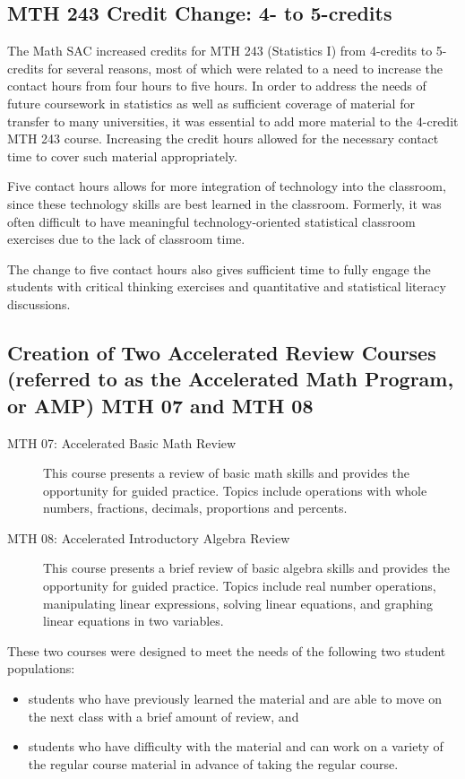 \subsection{MTH 243 Credit Change: 4- to 5-credits}
The Math SAC increased credits for MTH 243 (Statistics I) from 4-credits to 5-credits for several reasons, most of which were related to a need to increase the contact hours from four hours to five hours.  In order to address the needs of future coursework in statistics as well as sufficient coverage of material for transfer to many universities, it was essential to add more material to the 4-credit MTH 243 course.  Increasing the credit hours allowed for the necessary contact time to cover such material appropriately.
 
 
Five contact hours allows for more integration of technology into the classroom, since these technology skills are best learned in the classroom. Formerly, it was often difficult to have meaningful technology-oriented statistical classroom exercises due to the lack of classroom time.
 
The change to five contact hours also gives sufficient time to fully engage the students with critical thinking exercises and quantitative and statistical literacy discussions.

\subsection[Creation of AMP/MTH008]{Creation of Two Accelerated Review Courses (referred to as the Accelerated Math Program, or AMP) MTH 07 and MTH 08}
 
\begin{description}
\item[MTH 07: Accelerated Basic Math Review]  This course presents a review of basic math skills and provides the opportunity for guided practice.  Topics include operations with whole numbers, fractions, decimals, proportions and percents.

\item[MTH 08: Accelerated Introductory Algebra Review] This course presents a brief review of basic algebra skills and provides the opportunity for guided practice.  Topics include real number operations, manipulating linear expressions, solving linear equations, and graphing linear equations in two variables.
\end{description}

These two courses were designed to meet the needs of the following two student populations:
\begin{itemize}
\item students who have previously learned the material and are able to move on the next class with a brief amount of review, and
\item students who have difficulty with the material and can work on a variety of the regular course material in advance of taking the regular course.
\end{itemize}

